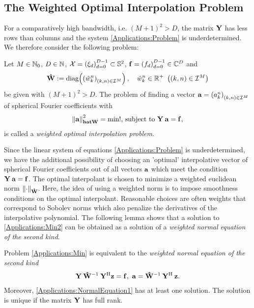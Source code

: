 \subsection{The Weighted Optimal Interpolation Problem}
  For a comparatively high bandwidth, i.e. $(M+1)^2 > D$, the matrix $\mathbf{Y}$ 
  has less rows than columns and the system \eqref{Applications:Problem} is 
  underdetermined. We therefore consider the following problem:
  \begin{definition}
    Let $M \in \mathbb{N}_{0}$, $D \in \mathbb{N}$, $\mathcal{X}=\left(\mathbf{\xi}_{d}\right)_{d=0}^{D-1} \subset \mathbb{S}^2$, 
    $\mathbf{f}=\left(f_{d}\right)_{d=0}^{D-1} \in \mathbb{C}^{D}$ and 
    \[
      \mathbf{\hat{W}} := \text{\rm{diag}}{\hspace{-0.4ex}}\left(\left(\hat{w}_{k}^n\right)_{(k,n) \in \mathcal{I}^M}\right),\quad 
      \hat{w}_{k}^n \in \mathbb{R}^{+} \ \left((k,n) \in \mathcal{I}^M\right)
    \]
    be given with $(M+1)^2 > D$. The problem of finding a vector $\mathbf{a}=\left(a_{k}^n\right)_{(k,n) 
    \in \mathcal{I}^M}$ of spherical Fourier coefficients with
    \begin{equation}
      \label{Applications:Min2}
      \left\|\mathbf{a}\right\|_{\mathbf{hat{W}}}^2 = \text{min!, subject to } \mathbf{Y}\:\mathbf{a} = \mathbf{f},
    \end{equation}
    is called a \emph{weighted optimal interpolation problem}.
  \end{definition}
  Since the linear system of equations \eqref{Applications:Problem} is underdetermined, we have the 
  additional possibility of choosing an 'optimal' interpolative vector of spherical Fourier coefficients 
  out of all vectors $\mathbf{a}$ which meet the condition $\mathbf{Y}\:\mathbf{a} = \mathbf{f}$. The optimal 
  interpolant is chosen to minimize a weighted euclidean norm $\left\|\cdot\right\|_{\mathbf{\hat{W}}}$. 
  Here, the idea of using a weighted norm is to impose smoothness conditions on the optimal interpolant. 
  Reasonable choices are often weights that correspond to Sobolev norms which also penalize the derivatives
  of the interpolative polynomial. The following lemma shows that a solution to
  \eqref{Applications:Min2} can be obtained as a solution of a 
  \emph{weighted normal equation of the second kind}.
  \begin{lemma}
    Problem \eqref{Applications:Min} is equivalent to the 
    \emph{weighted normal equation of the second kind}
    \begin{equation}
      \label{Applications:NormalEquation2}
      \mathbf{Y} \: \mathbf{\hat{W}}^{-1} \: \mathbf{Y}^{\text{\rm{H}}} \mathbf{z} = \mathbf{f},\ \mathbf{a} = \mathbf{\hat{W}}^{-1}\:\mathbf{Y}^{\text{\rm{H}}}\:\mathbf{z}.
    \end{equation}
    Moreover, \eqref{Applications:NormalEquation1} has at least one solution.
    The solution is unique if the matrix $\mathbf{Y}$ has full rank.
  \end{lemma}
